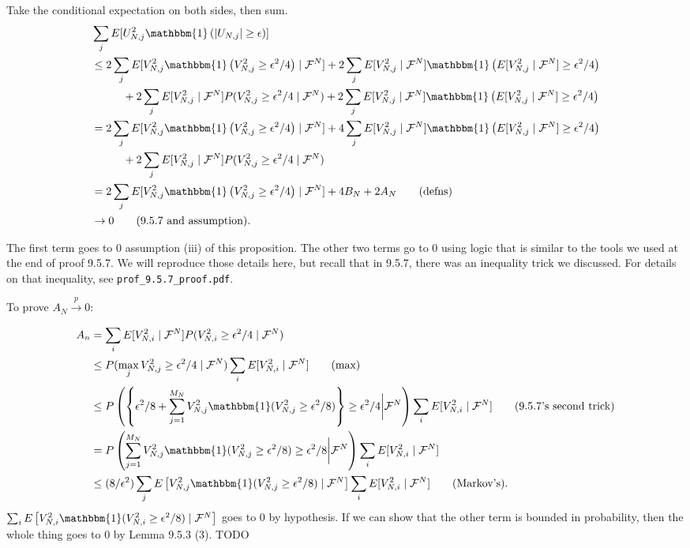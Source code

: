 \documentclass{article}
\begin{document}
Take the conditional expectation on both sides, then sum. 
\begin{align*}
&\sum_j E[U_{N,j}^2 \mathbbm{1} \left( |U_{N,j}| \ge \epsilon \right)  ] \\
&\le 2 \sum_j E[ V_{N,j}^2  \mathbbm{1}\left( V_{N,j}^2 \ge \epsilon^2/4 \right) \mid \mathcal{F}^N] + 2 \sum_j E[ V_{N,j}^2 \mid \mathcal{F}^N] \mathbbm{1}\left( E[V_{N,j}^2 \mid \mathcal{F}^N] \ge \epsilon^2/4 \right) \\
& \hspace{10mm} +  2 \sum_j E[V_{N,j}^2 \mid \mathcal{F}^N]  P( V_{N,j}^2 \ge \epsilon^2/4 \mid \mathcal{F}^N )  + 2 \sum_j E[V_{N,j}^2 \mid \mathcal{F}^N]  \mathbbm{1}\left( E[V_{N,j}^2 \mid \mathcal{F}^N] \ge \epsilon^2/4 \right) \\
&= 2 \sum_j E[ V_{N,j}^2 \mathbbm{1} \left( V_{N,j}^2 \ge \epsilon^2/4 \right) \mid \mathcal{F}^N] + 4 \sum_j E[ V_{N,j}^2 \mid \mathcal{F}^N] \mathbbm{1}\left(  E[V_{N,j}^2 \mid \mathcal{F}^N] \ge \epsilon^2/4 \right) \\
& \hspace{10mm} +  2 \sum_j E[V_{N,j}^2 \mid \mathcal{F}^N]  P( V_{N,j}^2 \ge \epsilon^2/4 \mid \mathcal{F}^N ) \\
&=2 \sum_j E[ V_{N,j}^2 \mathbbm{1}\left( V_{N,j}^2 \ge \epsilon^2/4 \right) \mid \mathcal{F}^N] +  4 B_N + 2A_N \tag{defns} \\
&\to 0 \tag{9.5.7 and assumption}.
\end{align*}

The first term goes to $0$ assumption (iii) of this proposition. The other two terms go to $0$ using logic that is similar to the tools we used at the end of proof 9.5.7. We will reproduce those details here, but recall that in 9.5.7, there was an inequality trick we discussed. For details on that inequality, see \verb|prof_9.5.7_proof.pdf|.

To prove $A_N \overset{p}{\to} 0$: 

\begin{align*}
A_n &= \sum_i E[ V_{N,i}^2  \mid \mathcal{F}^N] P(V_{N,i}^2 \ge \epsilon^2/4 \mid \mathcal{F}^N ) \\
&\le P(\max_j V_{N,j}^2 \ge \epsilon^2/4 \mid \mathcal{F}^N ) \sum_i E[ V_{N,i}^2  \mid \mathcal{F}^N] \tag{max} \\
&\le P\left( \left\{ \epsilon^2/8 + \sum_{j=1}^{M_N} V_{N,j}^2 \mathbbm{1}(V_{N,j}^2 \ge \epsilon^2/8) \right\}  \ge \epsilon^2/4 \bigg\rvert \mathcal{F}^N \right) \sum_i E[ V_{N,i}^2  \mid \mathcal{F}^N]  \tag{9.5.7's second trick} \\
&= P\left( \sum_{j=1}^{M_N} V_{N,j}^2 \mathbbm{1}(V_{N,j}^2 \ge \epsilon^2/8)   \ge \epsilon^2/8 \bigg\rvert \mathcal{F}^N \right) \sum_i E[  V_{N,i}^2  \mid \mathcal{F}^N]   \\
&\le (8/ \epsilon^2) \sum_j E\left[ V_{N,j}^2 \mathbbm{1}(V_{N,j}^2 \ge \epsilon^2/8) \mid \mathcal{F}^N \right]  \sum_i E[ V_{N,i}^2  \mid \mathcal{F}^N]  \tag{Markov's}.
\end{align*}
$\sum_i E\left[ V_{N,i}^2 \mathbbm{1}(V_{N,i}^2 \ge \epsilon^2/8) \mid \mathcal{F}^N \right]$ goes to $0$ by hypothesis. If we can show that the other term is bounded in probability, then the whole thing goes to $0$ by Lemma 9.5.3 (3). TODO
\end{document}

